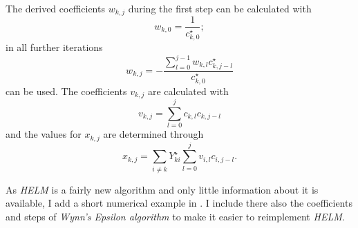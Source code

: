 The derived coefficients $w_{k,j}$ during the first step can be calculated with
\begin{equation}
	w_{k,0} = \frac{1}{c_{k,0}^\star};
\end{equation}
in all further iterations
\begin{equation}
	w_{k,j} = - \frac{\sum_{l = 0}^{j - 1} w_{k,l} c_{k,j - l}^\star}{c_{k,0}^\star}
\end{equation}
can be used. The coefficients $v_{k,j}$ are calculated with
\begin{equation}
	v_{k,j} = \sum_{l = 0}^j c_{k,l} c_{k,j - l}
\end{equation}
and the values for $x_{k,j}$ are determined through
\begin{equation}
	x_{k,j} = \sum_{i \ne k} Y_{ki}^\star \sum_{l = 0}^j v_{i,l} c_{i,j - l}.
\end{equation}

As \emph{HELM} is a fairly new algorithm and only little information about it is available, I add a short numerical example in . I include there also the coefficients and steps of \emph{Wynn's Epsilon algorithm} to make it easier to reimplement \emph{HELM}.
